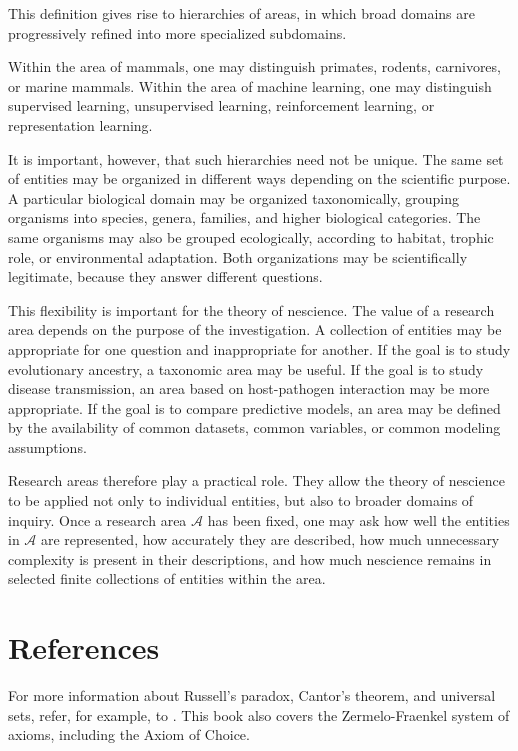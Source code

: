 This definition gives rise to hierarchies of areas, in which broad domains are progressively refined into more specialized subdomains.

\begin{example}
Within the area of mammals, one may distinguish primates, rodents, carnivores, or marine mammals. Within the area of machine learning, one may distinguish supervised learning, unsupervised learning, reinforcement learning, or representation learning. 
\end{example}

It is important, however, that such hierarchies need not be unique. The same set of entities may be organized in different ways depending on the scientific purpose. A particular biological domain may be organized taxonomically, grouping organisms into species, genera, families, and higher biological categories. The same organisms may also be grouped ecologically, according to habitat, trophic role, or environmental adaptation. Both organizations may be scientifically legitimate, because they answer different questions.

This flexibility is important for the theory of nescience. The value of a research area depends on the purpose of the investigation. A collection of entities may be appropriate for one question and inappropriate for another. If the goal is to study evolutionary ancestry, a taxonomic area may be useful. If the goal is to study disease transmission, an area based on host-pathogen interaction may be more appropriate. If the goal is to compare predictive models, an area may be defined by the availability of common datasets, common variables, or common modeling assumptions.

Research areas therefore play a practical role. They allow the theory of nescience to be applied not only to individual entities, but also to broader domains of inquiry. Once a research area $\mathcal{A}$ has been fixed, one may ask how well the entities in $\mathcal{A}$ are represented, how accurately they are described, how much unnecessary complexity is present in their descriptions, and how much nescience remains in selected finite collections of entities within the area.

%
%

\section*{References}

For more information about Russell's paradox, Cantor's theorem, and universal sets, refer, for example, to \cite{jech2013set}. This book also covers the Zermelo-Fraenkel system of axioms, including the Axiom of Choice. 


